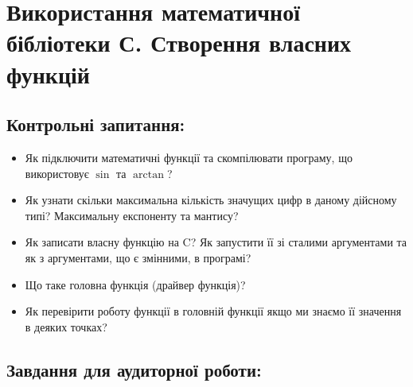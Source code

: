 \documentclass[a5paper,titlepage,openany,twoside,draft]{book_unv}%
\begin{document}
\chapter{ Використання математичної бібліотеки С. Створення власних функцій }
%

\section{Контрольні запитання:}

\begin{itemize}
\item
  Як підключити математичні функції та скомпілювати програму, що
  використовує $\sin$ та $\arctan$?

\item
  Як узнати скільки максимальна кількість значущих цифр в даному
  дійсному типі? Максимальну експоненту та мантису?

\item
  Як записати власну функцію на C? Як запустити її зі сталими
  аргументами та як з аргументами, що є змінними, в програмі?

\item
  Що таке головна функція (драйвер функція)?

\item
  Як перевірити роботу функції в головній функції якщо ми знаємо 
її значення в деяких точках? 

\end{itemize}

\section{Завдання для аудиторної роботи:}
\end{document}
